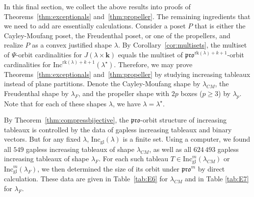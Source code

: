 \documentclass[12pt]{amsart}
\theoremstyle{definition}
\theoremstyle{remark}
\numberwithin{equation}{section}
\newcommand{\inc}{\ensuremath{\mathrm{Inc}}}
\newcommand{\incgl}{\inc_{\mathrm{gl}}}
\newcommand{\pro}{\mathfrak{pro}}
\newcommand{\rank}{\ensuremath{\mathrm{rk}}}
\newcommand{\inflate}{\ensuremath{\mathsf{VecInfl}}}
\newcommand{\tinflate}{\ensuremath{\mathsf{Infl}}}
\newcommand{\compress}{\ensuremath{\mathsf{DeflCon}}}
\begin{document}
In this final section, we collect the above results into proofs of Theorems~\ref{thm:exceptionals} and~\ref{thm:propeller}. The remaining ingredients that we need to add are essentially calculations. Consider a poset $P$ that is either the Cayley-Moufang poset, the Freudenthal poset, or one of the propellers, and realize $P$ as a convex justified shape $\lambda$. By Corollary~\ref{cor:multisets},  the multiset of $\Psi$-orbit cardinalities for $J(\lambda \times \mathbf{k})$ equals the multiset of $\pro^{\rank(\lambda)+ k+1}$-orbit cardinalities for $\inc^{ \rank(\lambda)+ k+1}(\lambda^\star)$. Therefore, we may prove Theorems~\ref{thm:exceptionals} and~\ref{thm:propeller} by studying increasing tableaux instead of plane partitions. Denote the Cayley-Moufang shape by $\lambda_{CM}$, the Freudenthal shape by $\lambda_F$, and the propeller shape with $2p$ boxes ($p \geq 3$) by $\lambda_p$. Note that for each of these shapes $\lambda$, we have $\lambda = \lambda^\star$.

By Theorem~\ref{thm:compressbijective}, the $\pro$-orbit structure of increasing tableaux is controlled by the data of gapless increasing tableaux and binary vectors. But for any fixed $\lambda$, $\incgl(\lambda)$ is a finite set. Using a computer, we found all $549$ gapless increasing tableaux of shape $\lambda_{CM}$, as well as all $624\, 493$ gapless increasing tableaux of shape $\lambda_F$. For each such tableau $T \in \incgl^m(\lambda_{CM})$ or $\incgl^m(\lambda_F)$, we then determined the size of its orbit under $\pro^m$ by direct calculation. These data are given in Table~\ref{tab:E6} for $\lambda_{CM}$ and in Table \ref{tab:E7} for $\lambda_F$. 
\end{document}
